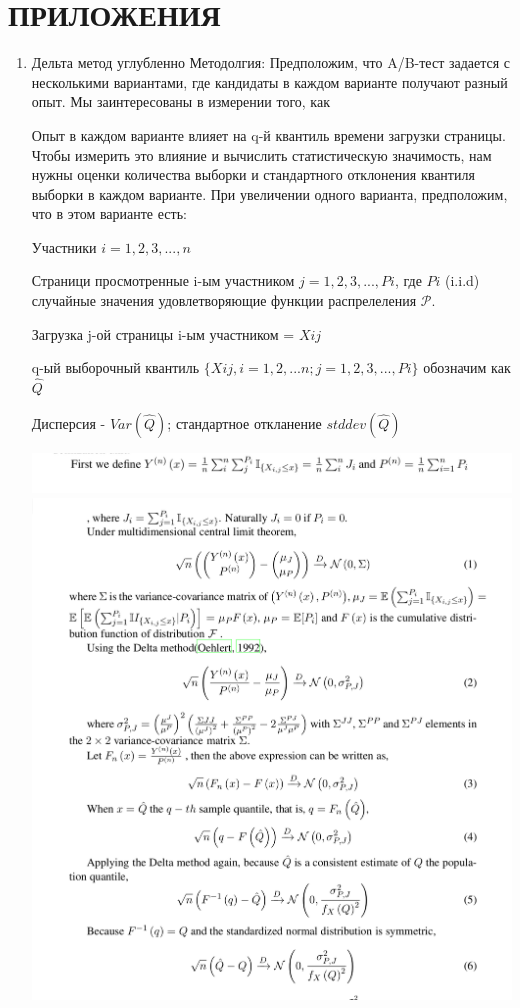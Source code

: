 \documentclass[specialist,
               substylefile = spbu_report.rtx,
               subf,href,colorlinks=true, 12pt]{disser}
\begin{document}
\section {ПРИЛОЖЕНИЯ}
\begin{enumerate} 

    \item Дельта метод углубленно
        \label{sec: Приложение 1}
        Методолгия:
        Предположим, что A/B-тест задается с несколькими вариантами, где кандидаты в каждом варианте получают разный опыт. Мы заинтересованы в измерении того, как
        
        Опыт в каждом варианте влияет на q-й квантиль времени загрузки страницы. Чтобы измерить это влияние и вычислить статистическую значимость, нам нужны оценки количества выборки и стандартного отклонения квантиля выборки в каждом варианте. При увеличении одного варианта, предположим, что в этом варианте есть:
        
        Участники $i = 1,2,3,  ... , n$

        Страници просмотренные i-ым участником $j = 1, 2, 3, ... ,\textit{P}{i}$, где $\textit{P}{i}$ (i.i.d) случайные значения удовлетворяющие функции распрелеления $\mathcal{P}$.

        Загрузка j-ой страницы i-ым участником = $\textit{X}{ij}$   

        q-ый выборочный квантиль $\{\textit{X}{ij}, i = 1,2,...n; j = 1,2,3, ... ,  \textit{P}{i} \}$ обозначим как $\widehat{Q}$ 

        Дисперсия - $Var(\widehat{Q} )$; стандартное откланение $stddev(\widehat{Q})$


        \includegraphics[width = 6in]{IMG_0086.jpg}
        \newline
        \includegraphics[width = 6in]{IMG_D1552B1059C6-1.jpeg}
        

\end{enumerate}
\end{document}
